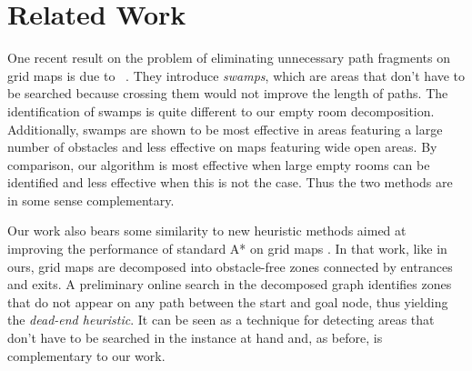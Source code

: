 \section{Related Work}
One recent result on the problem of eliminating unnecessary path fragments on grid maps is due to
\citeauthor{pochter09}~.
They introduce \emph{swamps}, which are areas that don't have to be searched
because crossing them would not improve the length of paths.
The identification of swamps is quite different to our empty room decomposition.
Additionally, swamps are shown to be most effective in areas featuring a large number of obstacles 
and less effective on maps featuring wide open areas.
By comparison, our algorithm is most effective when large empty rooms can be identified and less
effective when this is not the case.
Thus the two methods are in some sense complementary.
\par
Our work also bears some similarity to new heuristic methods aimed at improving the 
performance of standard A* on grid maps \cite{bjornsson06}.
In that work, like in ours, grid maps are decomposed into obstacle-free zones connected by entrances 
and exits.
A preliminary online search in the decomposed graph identifies zones that do not appear 
on any path between the start and goal node, thus yielding the \emph{dead-end heuristic}.
It can be seen as a technique for detecting areas that don't have to be searched
in the instance at hand and, as before, is complementary to our work.
